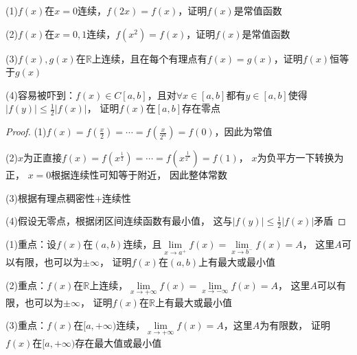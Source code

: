 \begin{exercise}[几道经典题目]
  (1)$f(x)$在$x = 0$连续，$f(2x) = f(x)$，证明$f(x)$是常值函数

  (2)$f(x)$在$x = 0,1$连续，$f(x^2) = f(x)$，证明$f(x)$是常值函数

  (3)$f(x),g(x)$在$\mathbb{R}$上连续，且在每个有理点有$f(x) = g(x)$，证明$f(x)$恒等于$g(x)$

  (4)容易被吓到：$f(x) \in C[a,b]$，且对$\forall x \in [a,b]$都有$y \in [a,b]$使得$|f(y)| \leq \frac{1}{2}|f(x)|$，
  证明$f(x)$在$[a,b]$存在零点
\end{exercise}

\begin{proof}
  (1)$f(x) = f(\frac{x}{2}) = \cdots = f(\frac{x}{2^n}) = f(0)$，因此为常值

  (2)$x$为正直接$f(x) = f(x^{\frac{1}{2}}) = \cdots = f(x^{\frac{1}{2^n}}) = f(1)$，
  $x$为负平方一下转换为正，
  $x = 0$根据连续性可知等于附近，
  因此整体常数

  (3)根据有理点稠密性+连续性

  (4)假设无零点，根据闭区间连续函数有最小值，
  这与$|f(y)| \leq \frac{1}{2}|f(x)|$矛盾
\end{proof}


\begin{exercise}[几道经典最值问题]
  (1)重点：设$f(x)$在$(a,b)$连续，且$\lim \limits _{x \rightarrow a^+} f(x) = \lim \limits _{x \rightarrow b^-}f(x) = A$，
  这里$A$可以有限，也可以为$\pm \infty$，
  证明$f(x)$在$(a,b)$上有最大或最小值

  (2)重点：$f(x)$在$\mathbb{R}$上连续，$\lim \limits _{x \rightarrow +\infty}f(x) = \lim \limits _{x \rightarrow -\infty}f(x) = A$，
  这里$A$可以有限，也可以为$\pm \infty$，
  证明$f(x)$在$\mathbb{R}$上有最大或最小值

  (3)重点：$f(x)$在$[a,+\infty)$连续，$\lim \limits _{x \rightarrow +\infty}f(x) = A$，这里$A$为有限数，
  证明$f(x)$在$[a,+\infty)$存在最大值或最小值
\end{exercise}

